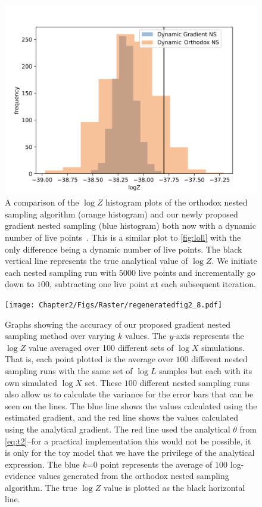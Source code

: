 \begin{figure} 
\centering    
\includegraphics[width=1.0\textwidth]{Chapter2/Figs/Raster/Screenshot 2023-01-03 at 17.40.14.png}
\caption{A comparison of the $\log Z$ histogram plots of the orthodox nested sampling algorithm (orange histogram) and our newly proposed gradient nested sampling (blue histogram) both now with a dynamic number of live points~\cite{Higson_2018}. This is a similar plot to \cref{fig:loll} with the only difference being a dynamic number of live points. The black vertical line represents the true analytical value of $\log Z$. We initiate each nested sampling run with $5000$ live points and incrementally go down to $100$, subtracting one live point at each subsequent iteration.}
\label{fig:logL function} 
\end{figure}




\begin{figure} 
\centering    
\texttt{[image: Chapter2/Figs/Raster/regeneratedfig2\_8.pdf]}
\caption{Graphs showing the accuracy of our proposed gradient nested sampling method over varying $k$ values. The $y$-axis represents the $\log Z$ value averaged over 100 different sets of $\log X$ simulations. That is, each point plotted is the average over $100$ different nested sampling runs with the same set of $\log L$ samples but each with its own simulated $\log X$ set. These $100$ different nested sampling runs also allow us to calculate the variance for the error bars that can be seen on the lines. The blue line shows the values calculated using the estimated gradient, and the red line shows the values calculated using the analytical gradient. The red line used the analytical $\theta$ from \cref{eq:t2}--for a practical implementation this would not be possible, it is only for the toy model that we have the privilege of the analytical expression. The blue $k$=0 point represents the average of $100$ log-evidence values generated from the orthodox nested sampling algorithm. The true $\log Z$ value is plotted as the black horizontal line.}
\label{fig:loglol}
\end{figure}

